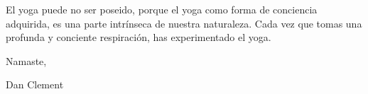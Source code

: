 \documentclass[a4paper]{book}
\begin{document}
El yoga puede no ser poseido, porque el yoga como forma de conciencia adquirida, es una parte intrínseca de nuestra naturaleza. Cada vez que tomas una profunda y conciente respiración, has experimentado el yoga.

Namaste,

Dan Clement

\newpage









\end{document}
